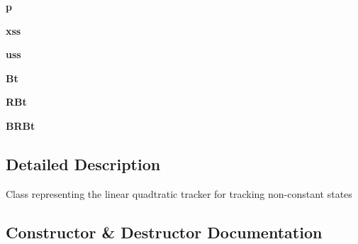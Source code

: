 \begin{DoxyCompactItemize}
{\bfseries p}
\item 
\mbox{\label{class_d_o_t__assignment_1_1controls_1_1_linear_feedback_augmented_a9ceae4c11ed3c06f8a8bed73615880b1}} 
{\bfseries xss}
\item 
\mbox{\label{class_d_o_t__assignment_1_1controls_1_1_linear_feedback_augmented_a62140d362f33262e04f51c2f2b500537}} 
{\bfseries uss}
\item 
\mbox{\label{class_d_o_t__assignment_1_1controls_1_1_linear_feedback_augmented_ae8ba9e9573964476b4bf94f274d194c5}} 
{\bfseries Bt}
\item 
\mbox{\label{class_d_o_t__assignment_1_1controls_1_1_linear_feedback_augmented_ab7f9bbcefedc40b4b15578e2962f24a3}} 
{\bfseries R\+Bt}
\item 
\mbox{\label{class_d_o_t__assignment_1_1controls_1_1_linear_feedback_augmented_a929d548dcff3fe31dd09f6b44f70f090}} 
{\bfseries B\+R\+Bt}
\end{DoxyCompactItemize}


\subsection{Detailed Description}
\begin{DoxyVerb}Class representing the linear quadtratic tracker for tracking non-constant states
\end{DoxyVerb}
 

\subsection{Constructor \& Destructor Documentation}
\mbox{\label{class_d_o_t__assignment_1_1controls_1_1_linear_feedback_augmented_adaa4957b87782b3bd7df59ff4ab36080}} 
